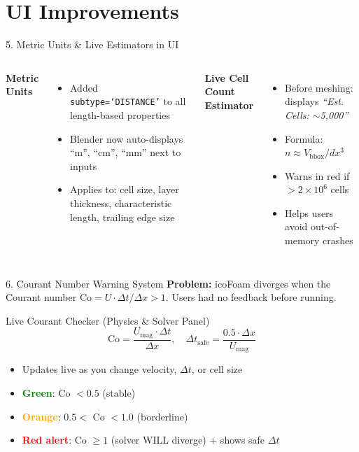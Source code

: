 \documentclass[dvipsnames,mathserif]{beamer}
\begin{document}
\section{UI Improvements}
\begin{frame}{5. Metric Units \& Live Estimators in UI}
    \begin{columns}
        \textbf{Metric Units}
        \begin{itemize}
            \item Added \texttt{subtype=`DISTANCE'} to all length-based properties
            \item Blender now auto-displays ``m'', ``cm'', ``mm'' next to inputs
            \item Applies to: cell size, layer thickness, characteristic length, trailing edge size
        \end{itemize}
        \textbf{Live Cell Count Estimator}
        \begin{itemize}
            \item Before meshing: displays \textit{``Est. Cells: $\sim$5,000''}
            \item Formula: $n \approx V_{\text{bbox}} / dx^3$
            \item Warns in red if $> 2\times10^6$ cells
            \item Helps users avoid out-of-memory crashes
        \end{itemize}
    \end{columns}
\end{frame}

\begin{frame}{6. Courant Number Warning System}
    \textbf{Problem:} icoFoam diverges when the Courant number $\text{Co} = U \cdot \Delta t / \Delta x > 1$. Users had no feedback before running.
    \vspace{0.2cm}
    \begin{block}{Live Courant Checker (Physics \& Solver Panel)}
        \[
            \text{Co} = \frac{U_{\text{mag}} \cdot \Delta t}{\Delta x}, \quad \Delta t_{\text{safe}} = \frac{0.5 \cdot \Delta x}{U_{\text{mag}}}
        \]
        \begin{itemize}
            \item Updates live as you change velocity, $\Delta t$, or cell size
            \item \textcolor{green}{\textbf{Green}}: Co $< 0.5$ (stable)
            \item \textcolor{orange}{\textbf{Orange}}: $0.5 <$ Co $< 1.0$ (borderline)
            \item \textcolor{red}{\textbf{Red alert}}: Co $\geq 1$ (solver WILL diverge) + shows safe $\Delta t$
        \end{itemize}
    \end{block}
\end{frame}
\end{document}

